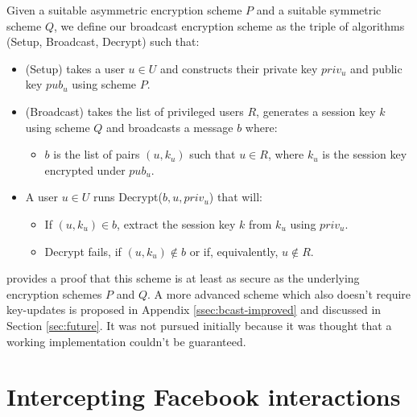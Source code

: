 \begin{defn}
    
    Given a suitable asymmetric encryption scheme $P$ and a suitable symmetric scheme $Q$, we define our broadcast encryption scheme as the triple of algorithms {\sc (Setup, Broadcast, Decrypt)} such that:
    
    \begin{itemize}
    
    \item {\sc (Setup)} takes a user $u \in U$ and constructs their private key $priv_u$ and public key $pub_u$ using scheme $P$.
    
    \item {\sc (Broadcast)} takes the list of privileged users $R$, generates a session key $k$ using scheme $Q$ and broadcasts a message $b$ where:
    
    \begin{itemize}
        \item $b$ is the list of pairs $(u,k_u)$ such that $u \in R$, where $k_u$ is the session key encrypted under $pub_u$.
    \end{itemize}
    
    
    \item A user $u \in U$ runs {\sc Decrypt($b, u, priv_u$)} that will:
    
        \begin{itemize}
            \item If $(u,k_u) \in b$, extract the session key $k$ from $k_u$ using $priv_u$.
        
            \item {\sc Decrypt} fails, if $(u,k_u) \notin b$ or if, equivalently, $u \notin R$.
        
        \end{itemize}

    \end{itemize}
    
\end{defn}    

\cite{survey} provides a proof that this scheme is at least as secure as the underlying encryption schemes $P$ and $Q$. A more advanced scheme which also doesn't require key-updates is proposed in Appendix \ref{ssec:bcast-improved} and discussed in Section \ref{sec:future}. It was not pursued initially because it was thought that a working implementation couldn't be guaranteed.


\FloatBarrier
\section{Intercepting Facebook interactions}

